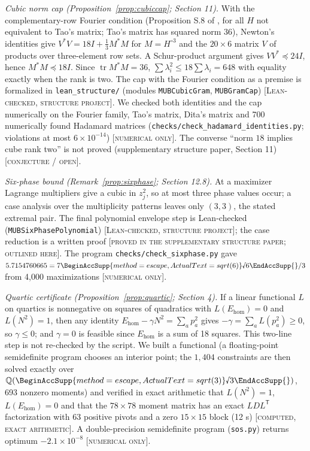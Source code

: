 \documentclass[11pt]{article}
\newcommand{\rnum}[1]{\BeginAccSupp{method=escape,ActualText=sqrt(#1)}\text{\textsurd}#1\EndAccSupp{}}
\newcommand{\rsix}{\rnum{6}}
\newcommand{\hcube}[1]{#1^{\circ 3}}     %
\newcommand{\st}[1]{\textsc{[#1]}}
\newcommand{\stlean}{\st{Lean-checked, structure project}}
\newcommand{\stsupp}{\st{proved in the supplementary structure paper; outlined here}}
\newcommand{\stexact}{\st{computed, exact arithmetic}}
\newcommand{\stnum}{\st{numerical only}}
\newcommand{\stconj}{\st{conjecture / open}}
\theoremstyle{definition}
\theoremstyle{remark}
\begin{document}
\emph{Cubic norm cap (Proposition~\ref{prop:cubiccap}; Section 11).} With the complementary-row Fourier condition
(Proposition S.8 of \cite{CWT}, for all $H$ not equivalent to Tao's matrix; Tao's matrix has squared norm $36$), Newton's
identities give $V^\ast V=18I+\tfrac13M^\ast M$ for $M=\hcube{H}$ and the $20\times6$ matrix $V$ of products over
three-element row sets. A Schur-product argument gives $VV^\ast\preceq24I$, hence $M^\ast M\preceq18I$. Since
$\operatorname{tr}M^\ast M=36$, $\sum\lambda_i^2\le18\sum\lambda_i=648$ with equality exactly when the rank is two.
The cap with the Fourier condition as a premise is formalized in \texttt{lean\_structure/} (modules \texttt{MUBCubicGram}, \texttt{MUBGramCap}) \stlean. We checked both identities and the cap numerically on the Fourier family,
Tao's matrix, Dita's matrix and 700 numerically found Hadamard matrices (\texttt{checks/check\_hadamard\_identities.py};
violations at most $6\times10^{-14}$) \stnum. The converse ``norm $18$ implies cube rank two'' is not proved
(supplementary structure paper, Section 11) \stconj.

\emph{Six-phase bound (Remark~\ref{prop:sixphase}; Section 12.8).} At a maximizer Lagrange multipliers give a cubic
in $z_j^2$, so at most three phase values occur; a case analysis over the multiplicity patterns leaves only $(3,3)$,
the stated extremal pair. The final polynomial envelope step is Lean-checked (\texttt{MUBSixPhasePolynomial}) \stlean; the case reduction is a written proof \stsupp. The program
\texttt{checks/check\_sixphase.py} gave $5.7154760665=7\rsix/3$ from 4,000 maximizations \stnum.

\emph{Quartic certificate (Proposition~\ref{prop:quartic}; Section 4).} If a linear functional $L$ on quartics is
nonnegative on squares of quadratics with $L(E_{\mathrm{hom}})=0$ and $L(N^2)=1$, then any identity
$E_{\mathrm{hom}}-\gamma N^2=\sum_ap_a^2$ gives $-\gamma=\sum_aL(p_a^2)\ge0$, so $\gamma\le0$; and $\gamma=0$ is
feasible since $E_{\mathrm{hom}}$ is a sum of 18 squares. This two-line step is not re-checked by the script.
We built a functional (a floating-point semidefinite program chooses an interior point; the
$1{,}404$ constraints are then solved exactly over $\mathbb{Q}(\rnum{3})$, 693 nonzero moments) and verified in exact
arithmetic that $L(N^2)=1$, $L(E_{\mathrm{hom}})=0$ and that the $78\times78$ moment matrix has an exact $LDL^{\mathsf T}$
factorization with 63 positive pivots and a zero $15\times15$ block (12 s) \stexact. A double-precision semidefinite
program (\texttt{sos.py}) returns optimum $-2.1\times10^{-8}$ \stnum.
\end{document}
